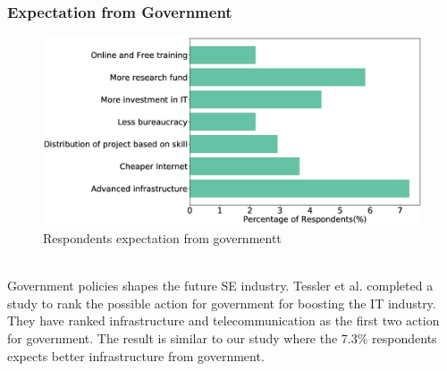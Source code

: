 \subsubsection{Expectation from Government}
\label{Expectation from Government}
\begin{figure}[htbp]
\includegraphics[scale=0.28]{Figures/GovernmentExpectation.eps} 
\caption{Respondents expectation from governmentt}
\label{fig:government expectation}
\end{figure}
\hfill\\
Government policies shapes the future SE industry. Tessler et al.\cite{Tessler2003} completed a study to rank the possible action for government for boosting the IT industry. They have ranked infrastructure and telecommunication as the first two action for government. The result is similar to our study where the 7.3\% respondents  expects  better infrastructure from government.
